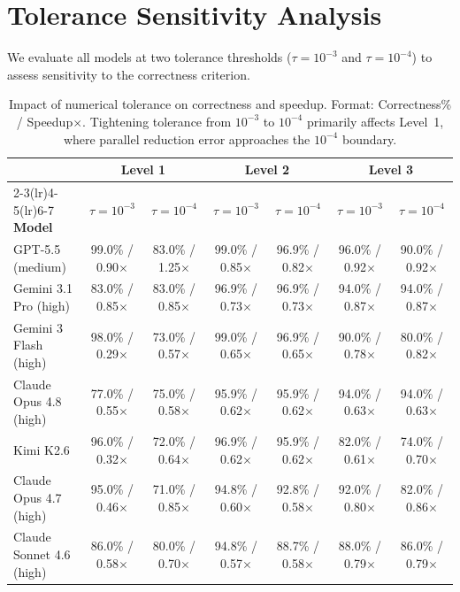 \documentclass[11pt]{article}
\begin{document}
\section{Tolerance Sensitivity Analysis}
\label{app:tolerance}

We evaluate all models at two tolerance thresholds ($\tau = 10^{-3}$ and $\tau = 10^{-4}$) to assess sensitivity to the correctness criterion.

\begin{table}[H]
\centering
\caption{Impact of numerical tolerance on correctness and speedup. Format: Correctness\% / Speedup$\times$. Tightening tolerance from $10^{-3}$ to $10^{-4}$ primarily affects Level~1, where parallel reduction error approaches the $10^{-4}$ boundary.}
\scriptsize
\begin{tabular}{l cc cc cc}
\toprule
& \multicolumn{2}{c}{\textbf{Level 1}} & \multicolumn{2}{c}{\textbf{Level 2}} & \multicolumn{2}{c}{\textbf{Level 3}} \\
\cmidrule(lr){2-3}\cmidrule(lr){4-5}\cmidrule(lr){6-7}
\textbf{Model} & $\tau\!=\!10^{-3}$ & $\tau\!=\!10^{-4}$ & $\tau\!=\!10^{-3}$ & $\tau\!=\!10^{-4}$ & $\tau\!=\!10^{-3}$ & $\tau\!=\!10^{-4}$ \\
\midrule
GPT-5.5 (medium)         & 99.0\% / 0.90$\times$ & 83.0\% / 1.25$\times$ & 99.0\% / 0.85$\times$ & 96.9\% / 0.82$\times$ & 96.0\% / 0.92$\times$ & 90.0\% / 0.92$\times$ \\
Gemini 3.1 Pro (high)    & 83.0\% / 0.85$\times$ & 83.0\% / 0.85$\times$ & 96.9\% / 0.73$\times$ & 96.9\% / 0.73$\times$ & 94.0\% / 0.87$\times$ & 94.0\% / 0.87$\times$ \\
Gemini 3 Flash (high)    & 98.0\% / 0.29$\times$ & 73.0\% / 0.57$\times$ & 99.0\% / 0.65$\times$ & 96.9\% / 0.65$\times$ & 90.0\% / 0.78$\times$ & 80.0\% / 0.82$\times$ \\
Claude Opus 4.8 (high)   & 77.0\% / 0.55$\times$ & 75.0\% / 0.58$\times$ & 95.9\% / 0.62$\times$ & 95.9\% / 0.62$\times$ & 94.0\% / 0.63$\times$ & 94.0\% / 0.63$\times$ \\
Kimi K2.6                & 96.0\% / 0.32$\times$ & 72.0\% / 0.64$\times$ & 96.9\% / 0.62$\times$ & 95.9\% / 0.62$\times$ & 82.0\% / 0.61$\times$ & 74.0\% / 0.70$\times$ \\
Claude Opus 4.7 (high)   & 95.0\% / 0.46$\times$ & 71.0\% / 0.85$\times$ & 94.8\% / 0.60$\times$ & 92.8\% / 0.58$\times$ & 92.0\% / 0.80$\times$ & 82.0\% / 0.86$\times$ \\
Claude Sonnet 4.6 (high) & 86.0\% / 0.58$\times$ & 80.0\% / 0.70$\times$ & 94.8\% / 0.57$\times$ & 88.7\% / 0.58$\times$ & 88.0\% / 0.79$\times$ & 86.0\% / 0.79$\times$ \\
\bottomrule
\end{tabular}
\end{table}
\end{document}
